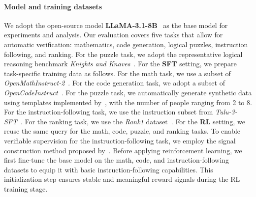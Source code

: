 \documentclass{article} %
\begin{document}
\paragraph{Model and training datasets}
We adopt the open-source model \textbf{LLaMA-3.1-8B}~\citep{grattafiori2024llama} as the base model for experiments and analysis. Our evaluation covers five tasks that allow for automatic verification: mathematics, code generation, logical puzzles, instruction following, and ranking. For the puzzle task, we adopt the representative logical reasoning benchmark \textit{Knights and Knaves}~\citep{johnson1990meta}. For the \textbf{SFT} setting, we prepare task-specific training data as follows. For the math task, we use a subset of \textit{OpenMathInstruct-2}~\citep{ahmad2025opencodeinstructlargescaleinstructiontuning}. For the code generation task, we adopt a subset of \textit{OpenCodeInstruct}~\citep{ahmad2025opencodeinstructlargescaleinstructiontuning}. For the puzzle task, we automatically generate synthetic data using templates implemented by~\cite{xie2024memorization}, with the number of people ranging from 2 to 8. For the instruction-following task, we use the instruction subset from \textit{Tulu-3-SFT}~\citep{lambert2025tulu3pushingfrontiers}. For the ranking task, we use the \textit{Rank1} dataset~\citep{weller2025rank1testtimecomputereranking}. For the \textbf{RL} setting, we reuse the same query for the math, code, puzzle, and ranking tasks. To enable verifiable supervision for the instruction-following task, we employ the signal construction method proposed by~\cite{pyatkin2025generalizing}.  Before applying reinforcement learning, we first fine-tune the base model on the math, code, and instruction-following datasets to equip it with basic instruction-following capabilities. This initialization step ensures stable and meaningful reward signals during the RL training stage. 
\end{document}
